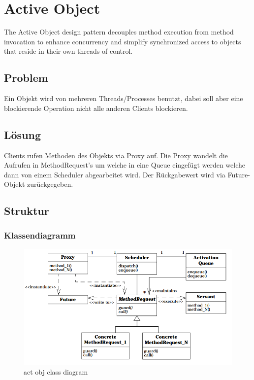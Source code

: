 \section{Active Object}

The Active Object design pattern decouples method execution from method invocation to enhance concurrency and simplify synchronized access to objects that reside in their own threads of control.


\subsection{Problem}


Ein Objekt wird von mehreren Threads/Processes benutzt, dabei soll aber eine blockierende Operation nicht alle anderen Clients blockieren.

\subsection{Lösung}


Clients rufen Methoden des Objekts via Proxy auf. Die Proxy wandelt die Aufrufen in MethodRequest's um welche in eine Queue eingefügt werden welche dann von einem Scheduler abgearbeitet wird.
Der Rückgabewert wird via Future-Objekt zurückgegeben.

\subsection{Struktur}


\subsubsection*{Klassendiagramm}

\begin{figure}[H]
	\centering
	\includegraphics[width=\textwidth]{content/posa2/active-object/images/act-obj_class-diagram.png}
	\caption{act obj class diagram}
\end{figure}



